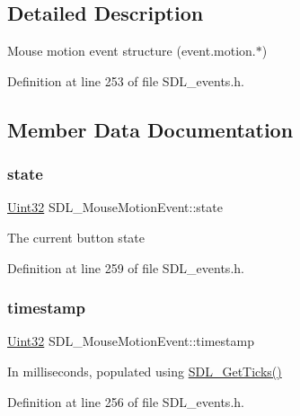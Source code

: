 \subsection{Detailed Description}
Mouse motion event structure (event.\+motion.$\ast$) 

Definition at line 253 of file S\+D\+L\+\_\+events.\+h.



\subsection{Member Data Documentation}
\mbox{\label{struct_s_d_l___mouse_motion_event_a3f6e9bad9d959b824881ba09e05b7024}} 
\subsubsection{\texorpdfstring{state}{state}}
{\footnotesize\ttfamily \mbox{\hyperlink{_s_d_l__stdinc_8h_add440eff171ea5f55cb00c4a9ab8672d}{Uint32}} S\+D\+L\+\_\+\+Mouse\+Motion\+Event\+::state}

The current button state 

Definition at line 259 of file S\+D\+L\+\_\+events.\+h.

\mbox{\label{struct_s_d_l___mouse_motion_event_af530bc0ef327ea6d497c5b1da119841c}} 
\subsubsection{\texorpdfstring{timestamp}{timestamp}}
{\footnotesize\ttfamily \mbox{\hyperlink{_s_d_l__stdinc_8h_add440eff171ea5f55cb00c4a9ab8672d}{Uint32}} S\+D\+L\+\_\+\+Mouse\+Motion\+Event\+::timestamp}

In milliseconds, populated using \mbox{\hyperlink{_s_d_l__timer_8h_a0b9bc71d6287e0ffafdc3419760fe2b3}{S\+D\+L\+\_\+\+Get\+Ticks()}} 

Definition at line 256 of file S\+D\+L\+\_\+events.\+h.

\mbox{\label{struct_s_d_l___mouse_motion_event_a431dd28cd6db6a7335cf633dbeb80cfb}} 

